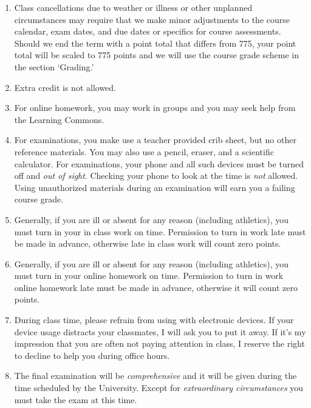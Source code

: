 \documentclass[12pt]{article}
\newcounter{ex}\setcounter{ex}{0}
\begin{document}
\begin{enumerate}

\item Class cancellations due to weather or illness or other 
unplanned circumstances may require that we make minor adjustments
to the course calendar, exam dates, and due dates or specifics for 
course assessments. Should we end the term with a point total that
differs from 775, your point total will be scaled to 775 points and
we will use the course grade scheme in the section `Grading.'

\item Extra credit is not allowed. 

\item For online homework, you may work in groups and you may 
seek help from the Learning Commons. 

\item For examinations, you make use a teacher provided crib sheet, 
but no other reference materials. You may also use a pencil, eraser, 
and a scientific calculator. For examinations, your phone and all such
devices must be turned off and \emph{out of sight}. Checking your phone
to look at the time is \emph{not} allowed. Using unauthorized 
materials during an examination will earn you a failing course grade.

\item Generally, if you are ill or absent for any reason (including 
athletics), you must turn in your in class work on time. Permission to
turn in work late must be made in advance, otherwise late in class work 
will count zero points.

\item Generally,  if you are ill or absent for any reason (including 
athletics), you must turn in your online homework on time. Permission to
turn in work online homework late must be made in advance, otherwise it will
count zero points.
 

\item During class time, please refrain from using with electronic devices. If your 
device usage distracts your classmates, I will ask you to put it away. If it's my 
impression that you are often not paying attention in class, I reserve the right to 
decline to help you during office hours.

\item The final examination will be \emph{comprehensive} and it will be given during the 
time scheduled by the University. Except for \emph{extraordinary circumstances}
you must take the exam at this time.



\end{enumerate}
\end{document}
